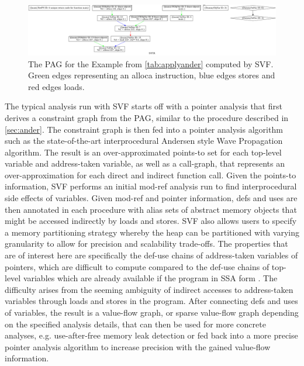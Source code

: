 \begin{figure}
    \centering
    \includegraphics[width=1.\textwidth]{img/pag.png}
    \caption[An example PAG as produced by SVF]{The PAG for the Example from \autoref{tab:applyander} computed by SVF.
        Green edges representing an alloca instruction, blue edges stores and red edges loads.}
    \label{fig:pag}
\end{figure}

The typical analysis run with SVF starts off with a pointer analysis that first derives a constraint graph from the PAG, similar to the procedure described in \autoref{sec:ander}.
The constraint graph is then fed into a pointer analysis algorithm such as the state-of-the-art interprocedural Andersen style Wave Propagation algorithm.
The result is an over-approximated points-to set for each top-level variable and address-taken variable, as well as a call-graph, that represents an over-approximation for each direct and indirect function call.
Given the points-to information, SVF performs an initial mod-ref analysis run to find interprocedural side effects of variables. Given mod-ref and pointer information, defs and uses are then annotated in each procedure with alias sets of abstract memory objects that might be accessed indirectly by loads and stores.
SVF also allows users to specify a memory partitioning strategy whereby the heap can be partitioned with varying granularity to allow for precision and scalability trade-offs.
The properties that are of interest here are specifically the def-use chains of address-taken variables of pointers, which are difficult to compute compared to the def-use chains of top-level variables which are already available if the program in SSA form \cite{sui2016svf}.
The difficulty arises from the seeming ambiguity of indirect accesses to address-taken variables through loads and stores in the program.
After connecting defs and uses of variables, the result is a value-flow graph, or sparse value-flow graph depending on the specified analysis details, that can then be used for more concrete analyses, e.g. use-after-free memory leak detection \cite{sui2014detecting} or fed back into a more precise pointer analysis algorithm to increase precision with the gained value-flow information.

